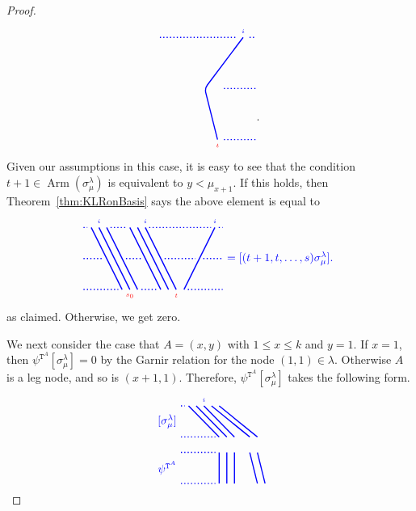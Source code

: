 \documentclass[twoside,11pt,reqno,letter]{amsart}
\numberwithin{equation}{section}
\theoremstyle{definition}  %
\newcommand{\Arm}{\operatorname{Arm}}
\newcommand{\0}{{\bar 0}}
\newcommand{\1}{{\bar 1}}
\newcommand{\la}{\lambda}
\newcommand{\si}{\sigma}
\def\T{{\mathtt T}}
\newenvironment{braid}{%
  \begin{tikzpicture}[baseline=6mm,blue,line width=1pt, scale=0.4,
                      draw/.append style={rounded corners},
                      every node/.append style={font=\tiny}]%
  }{\end{tikzpicture}
}
\begin{document}
{\begin{proof}
\[\begin{braid}
    \draw[dotted](7.5,8)--(13.5,8);
    \draw(14,8)node[above]{$i$}--(11,4)--(12,0)node[below,color=red]{$t$};
    \draw[dotted](14.5,8)--(15,8);
    \draw[dotted](12.5,4)--(15,4);
    \draw[dotted](12.5,0)--(15,0);
  \end{braid}.
\]
Given our assumptions in this case, it is easy to see that the condition $t+1 \in \Arm(\si^\la_\mu)$ is equivalent to $y < \mu_{x+1}$. If this holds, then Theorem~\ref{thm:KLRonBasis} says the above element is equal to 
\[
  \begin{braid}\tikzset{scale=0.6,baseline=12mm}
    \draw[dotted](0,8)--(0.5,8);
    \draw[dotted](0,4)--(2.5,4);
    \draw[dotted](0,0)--(4.5,0);
    \draw(1,8)--(5,0);
    \draw(2,8)node[above]{$i$}--(6,0)node[below,color=red]{$s_0$};
    \draw(3,8)--(7,0);
    \draw[dotted](3.5,8)--(5.5,8);
    \draw[dotted](5.5,4)--(7.5,4);
    \draw[dotted](7.5,0)--(9.5,0);
    \draw(6,8)--(10,0);
    \draw(7,8)--(11,0);
    \draw(8,8)node[above]{$i$}--(12,0)node[below,color=red]{$t$};
    \draw[dotted](8.5,8)--(16.5,8);
    \draw[dotted](10.5,4)--(14.5,4);
    \draw(17,8)node[above]{$i$}--(13,0);
    \draw[dotted](17.5,8)--(18,8);
    \draw[dotted](15.5,4)--(18,4);
    \draw[dotted](13.5,0)--(18,0);
  \end{braid}
  \begin{braid}\tikzset{scale=0.6,baseline=12mm}
    \draw(0,4)node[font=\normalsize]{$=[(t+1, t, \dots, s) \si^\la_\mu]$.};
  \end{braid}
\]
as claimed. Otherwise, we get zero.





  We next consider the case that $A =(x,y)$ with $1 \leq x \leq k$ and $y = 1$. If $x = 1$, then $\psi^{\T^A} [\si^\la_\mu] = 0$ by the Garnir relation for the node $(1,1) \in \la$. Otherwise $A$ is a leg node, and so is $(x+1, 1)$. Therefore, $\psi^{\T^A} [\si^\la_\mu]$ takes the following form.
\[
  \begin{braid}\tikzset{scale=0.6,baseline=12mm}
    \draw(-2,8)node[left,font=\normalsize]{$[\si^\la_\mu]$};
    \draw(-2,2)node[left,font=\normalsize]{$\psi^{\T^A}$};

    \draw[dotted](-2,10)--(-1.5,10);
    \draw[dotted](-2,6)--(2.5,6);
    \draw[dotted](-2,4)--(2.5,4);
    \draw[dotted](-2,0)--(2.5,0);

    \draw(-1,10)--(3,6); \draw(3,4)--(3,0);
    \draw(0,10)--(4,6); \draw(4,4)--(4,0);
    \draw(1,10)node[above]{$i$}--(5,6); \draw(5,4)--(5,0);
    \draw(2,10)--(7,6); \draw(7,4)--(8,0);
    \draw(3,10)--(8,6); \draw(8,4)--(9,0);


\end{braid}\]
\end{proof}}
\end{document}

